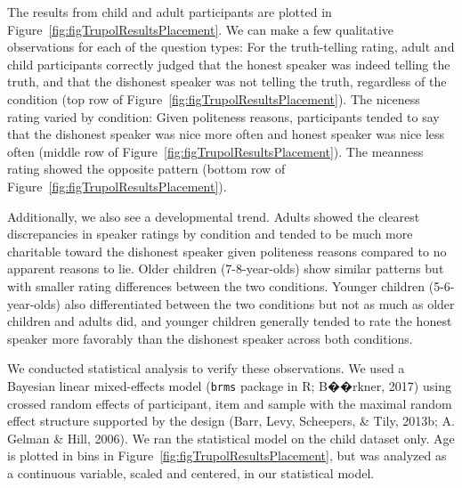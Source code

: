 \documentclass[oneside]{report}
\begin{document}
The results from child and adult participants are plotted in
Figure~\ref{fig:figTrupolResultsPlacement}. We can make a few
qualitative observations for each of the question types: For the
truth-telling rating, adult and child participants correctly judged that
the honest speaker was indeed telling the truth, and that the dishonest
speaker was not telling the truth, regardless of the condition (top row
of Figure~\ref{fig:figTrupolResultsPlacement}). The niceness rating
varied by condition: Given politeness reasons, participants tended to
say that the dishonest speaker was nice more often and honest speaker
was nice less often (middle row of
Figure~\ref{fig:figTrupolResultsPlacement}). The meanness rating showed
the opposite pattern (bottom row of
Figure~\ref{fig:figTrupolResultsPlacement}).

Additionally, we also see a developmental trend. Adults showed the
clearest discrepancies in speaker ratings by condition and tended to be
much more charitable toward the dishonest speaker given politeness
reasons compared to no apparent reasons to lie. Older children
(7-8-year-olds) show similar patterns but with smaller rating
differences between the two conditions. Younger children (5-6-year-olds)
also differentiated between the two conditions but not as much as older
children and adults did, and younger children generally tended to rate
the honest speaker more favorably than the dishonest speaker across both
conditions.

We conducted statistical analysis to verify these observations. We used
a Bayesian linear mixed-effects model (\texttt{brms} package in R;
B��rkner, 2017) using crossed random effects of participant, item and
sample with the maximal random effect structure supported by the design
(Barr, Levy, Scheepers, \& Tily, 2013b; A. Gelman \& Hill, 2006). We ran
the statistical model on the child dataset only. Age is plotted in bins
in Figure~\ref{fig:figTrupolResultsPlacement}, but was analyzed as a
continuous variable, scaled and centered, in our statistical model.
\end{document}
